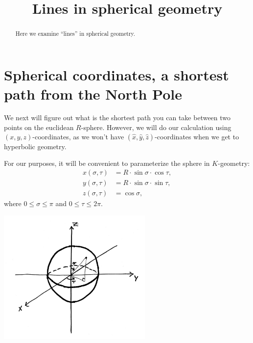 \documentclass{ximera}
\title{Lines in spherical geometry}
\begin{document}
\begin{abstract}
Here we examine ``lines'' in spherical geometry.
\end{abstract}
\maketitle


\section{Spherical coordinates, a shortest path from the North Pole}

We next will figure out what is the shortest path you can take between
two points on the euclidean $R$-sphere. However, we will do our
calculation using $(x,y,z)$-coordinates, as we won't have
$(\hat{x},\hat{y},\hat{z})$-coordinates when we get to hyperbolic
geometry.

For our purposes, it will be convenient to parameterize the sphere in
$K$-geometry:%
\begin{align*}
x(\sigma,\tau) &=R\cdot \sin\sigma\cdot \cos \tau,\\
y(\sigma,\tau) &=R\cdot \sin\sigma\cdot \sin\tau,\\
z(\sigma,\tau) &=\cos \sigma,
\end{align*}
where $0\le \sigma\le\pi$ and $0\le \tau\le 2\pi$.

\begin{image}
  \includegraphics[width=3in]{spherePara.jpg}
\end{image}
\end{document}
